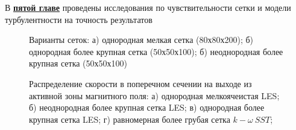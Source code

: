 В \underline{\textbf{пятой главе}} проведены исследования по чувствительности сетки и модели турбулентности на точность результатов

\begin{figure}[h]
	\caption{Варианты сеток: а) однородная мелкая сетка (80х80х200); б) однородная более крупная сетка (50х50х100); б) неоднородная более крупная сетка (50х50х100)}
	\label{fig:mesh}
\end{figure}

\begin{figure}[h]
	\caption{Распределение скорости в поперечном сечении на выходе из активной зоны магнитного поля: а) однородная мелкоячеистая LES; б) неоднородная более крупная сетка LES; в) однородная более крупная сетка LES; г) равномерная более грубая сетка $ k- \omega~SST $;}
	\label{fig:surf_velocity_models}
\end{figure}


